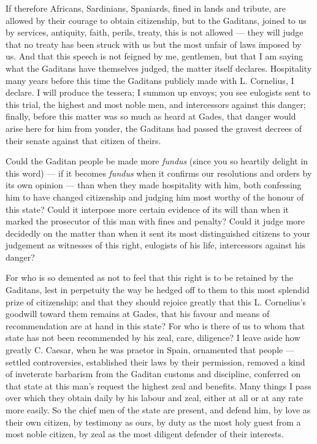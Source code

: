  If therefore Africans, Sardinians, Spaniards, fined in lands and tribute, are allowed by their courage to obtain citizenship, but to the Gaditans, joined to us by services, antiquity, faith, perils, treaty, this is not allowed --- they will judge that no treaty has been struck with us but the most unfair of laws imposed by us. And that this speech is not feigned by me, gentlemen, but that I am saying what the Gaditans have themselves judged, the matter itself declares. Hospitality many years before this time the Gaditans publicly made with L. Cornelius, I declare. I will produce the tessera; I summon up envoys; you see eulogists sent to this trial, the highest and most noble men, and intercessors against this danger; finally, before this matter was so much as heard at Gades, that danger would arise here for him from yonder, the Gaditans had passed the gravest decrees of their senate against that citizen of theirs.

 Could the Gaditan people be made more \textit{fundus} (since you so heartily delight in this word) --- if it becomes \textit{fundus} when it confirms our resolutions and orders by its own opinion --- than when they made hospitality with him, both confessing him to have changed citizenship and judging him most worthy of the honour of this state? Could it interpose more certain evidence of its will than when it marked the prosecutor of this man with fines and penalty? Could it judge more decidedly on the matter than when it sent its most distinguished citizens to your judgement as witnesses of this right, eulogists of his life, intercessors against his danger?

 For who is so demented as not to feel that this right is to be retained by the Gaditans, lest in perpetuity the way be hedged off to them to this most splendid prize of citizenship; and that they should rejoice greatly that this L. Cornelius's goodwill toward them remains at Gades, that his favour and means of recommendation are at hand in this state? For who is there of us to whom that state has not been recommended by his zeal, care, diligence? I leave aside how greatly C. Caesar, when he was praetor in Spain, ornamented that people --- settled controversies, established their laws by their permission, removed a kind of inveterate barbarism from the Gaditan customs and discipline, conferred on that state at this man's request the highest zeal and benefits. Many things I pass over which they obtain daily by his labour and zeal, either at all or at any rate more easily. So the chief men of the state are present, and defend him, by love as their own citizen, by testimony as ours, by duty as the most holy guest from a most noble citizen, by zeal as the most diligent defender of their interests.

